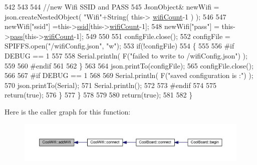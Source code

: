 \begin{DoxyCode}
542             
543             
544             \textcolor{comment}{//new Wifi SSID and PASS}
545             JsonObject& newWifi = json.createNestedObject( \textcolor{stringliteral}{"Wifi"}+String( this->
      \hyperlink{classCoolWifi_ab133bd92fcb895b884deecd6678592e4}{wifiCount}-1 ) );
546             
547             newWifi[\textcolor{stringliteral}{"ssid"}] =this->\hyperlink{classCoolWifi_a893b21d0fed821438733bba2e73fb4c2}{ssid}[this->\hyperlink{classCoolWifi_ab133bd92fcb895b884deecd6678592e4}{wifiCount}-1];
548             newWifi[\textcolor{stringliteral}{"pass"}] = this->\hyperlink{classCoolWifi_a0c3332a149245aaad060b32593a54c9b}{pass}[this->\hyperlink{classCoolWifi_ab133bd92fcb895b884deecd6678592e4}{wifiCount}-1];
549             
550 
551             configFile.close();
552             configFile = SPIFFS.open(\textcolor{stringliteral}{"/wifiConfig.json"}, \textcolor{stringliteral}{"w"});
553             \textcolor{keywordflow}{if}(!configFile)
554             \{
555             
556 \textcolor{preprocessor}{            #if DEBUG == 1 }
557 
558                 Serial.println( F(\textcolor{stringliteral}{"failed to write to /wifiConfig.json"}) );
559             
560 \textcolor{preprocessor}{            #endif}
561 
562             \}
563             
564             json.printTo(configFile);
565             configFile.close();
566 
567 \textcolor{preprocessor}{        #if DEBUG == 1 }
568 
569             Serial.println( F(\textcolor{stringliteral}{"saved configuration is :"}) );
570             json.printTo(Serial);
571             Serial.println();
572         
573 \textcolor{preprocessor}{        #endif}
574 
575             \textcolor{keywordflow}{return}(\textcolor{keyword}{true}); 
576         \}
577     \}   
578 
579     
580     \textcolor{keywordflow}{return}(\textcolor{keyword}{true});
581     
582 \}
\end{DoxyCode}
Here is the caller graph for this function\+:\nopagebreak
\begin{figure}[H]
\begin{center}
\leavevmode
\includegraphics[width=350pt]{classCoolWifi_a914d7a1df14dd6b75345fb614c34e9d6_icgraph}
\end{center}
\end{figure}
\mbox{\label{classCoolWifi_a46942fed90e475112cc10b78a32e7aaa}} 
